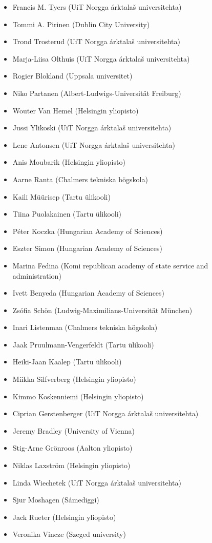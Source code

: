 \documentclass[11pt,a4paper]{article}
\begin{document}
\begin{itemize}
  \item Francis M. Tyers (UiT Norgga árktalaš universitehta)
  \item Tommi A. Pirinen (Dublin City University)
  \item Trond Trosterud (UiT Norgga árktalaš universitehta)
  \item Marja-Liisa Olthuis (UiT Norgga árktalaš universitehta)
  \item Rogier Blokland (Uppsala universitet)
  \item Niko Partanen (Albert-Ludwigs-Universität Freiburg)
  \item Wouter Van Hemel (Helsingin yliopisto)
  \item Jussi Ylikoski (UiT Norgga árktalaš universitehta)
  \item Lene Antonsen (UiT Norgga árktalaš universitehta)
  \item Anis Moubarik (Helsingin yliopisto)
  \item Aarne Ranta (Chalmers tekniska högskola)
  \item Kaili Müürisep (Tartu ülikooli)
  \item Tiina Puolakainen (Tartu ülikooli)
  \item Péter Koczka (Hungarian Academy of Sciences)
  \item Eszter Simon (Hungarian Academy of Sciences)
  \item Marina Fedina (Komi republican academy of state service and administration)
  \item Ivett Benyeda (Hungarian Academy of Sciences)
  \item Zsófia Schön (Ludwig-Maximilians-Universität München)
  \item Inari Listenmaa (Chalmers tekniska högskola)
  \item Jaak Pruulmann-Vengerfeldt (Tartu ülikooli)
  \item Heiki-Jaan Kaalep (Tartu ülikooli)
  \item Miikka Silfverberg (Helsingin yliopisto)
  \item Kimmo Koskenniemi (Helsingin yliopisto)
  \item Ciprian Gerstenberger (UiT Norgga árktalaš universitehta)
  \item Jeremy Bradley (University of Vienna)
  \item Stig-Arne Grönroos (Aalton yliopisto)
  \item Niklas Laxström (Helsingin yliopisto)
  \item Linda Wiechetek (UiT Norgga árktalaš universitehta)
  \item Sjur Moshagen (Sámediggi)
  \item Jack Rueter (Helsingin yliopisto)
  \item Veronika Vincze (Szeged university)
\end{itemize}
\end{document}
